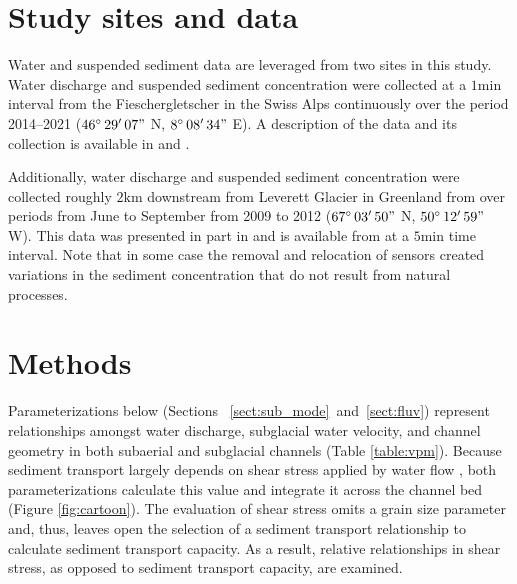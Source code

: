 \documentclass[11pt]{article}
\newcommand{\TODO}[1]{\textbf{TODO: \color{red}#1}}
\newcommand{\unit}[1]{$\mathrm{#1}$}
\begin{document}
\section{Study sites and data}
\label{sect:ss_data}


Water and suspended sediment data are leveraged from two sites in this study.
Water discharge and suspended sediment concentration were collected at a $1$\unit{min} interval from the Fieschergletscher in the Swiss Alps  continuously over the period 2014--2021 ($46^\circ\,29'\,07"$ N, $8^\circ\,08'\,34"$ E).
A description of the data and its collection is available in \citet{felix2022} and \citet{felix2021}.

Additionally, water discharge and suspended sediment concentration were collected roughly $2$\unit{km} downstream from Leverett Glacier in Greenland from over  periods from June to September from 2009 to 2012 ($67^\circ\,03'\,50"$ N, $50^\circ\,12'\,59"$ W).
This data was presented in part in \citet{cowton2012} and is available from \citet{tedstone2017} at a $5$\unit{min} time interval.
Note that in some case the removal and relocation of sensors created variations in the sediment concentration that do not result from natural processes.

\section{Methods}
\label{sect:meth}
Parameterizations below (Sections ~\ref{sect:sub_mode}~and~\ref{sect:fluv}) represent relationships amongst water discharge, subglacial water velocity, and channel geometry in both subaerial and subglacial channels (Table \ref{table:vpm}).
Because sediment transport largely depends on shear stress applied by water flow \citep{shields1936}, both parameterizations calculate this value and integrate  it across the channel bed (Figure \ref{fig:cartoon}).
The evaluation of shear stress omits a grain size parameter and, thus, leaves open the selection of a sediment transport relationship  \citep[e.g.][]{shields1936,meyer1948} to  calculate sediment transport capacity.
As a result, relative relationships in shear stress, as opposed to sediment transport capacity, are examined.
\end{document}
